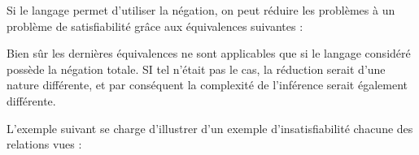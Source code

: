 \par Si le langage permet d'utiliser la négation, on peut réduire les problèmes à un problème de satisfiabilité grâce aux équivalences suivantes :


\par Bien sûr les dernières équivalences ne sont applicables que si le langage considéré possède la négation totale. SI tel n'était pas le cas, la réduction serait d'une nature différente, et par conséquent la complexité de l'inférence serait également différente.

\par L'exemple suivant se charge d'illustrer d'un exemple d'insatisfiabilité chacune des relations vues :



